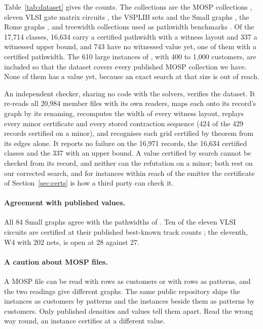 Table~\ref{tab:dataset} gives the counts. The collections are the MOSP
collections
\citep{SmithGent2005,FaggioliBentivoglio1998,ChuStuckey2009,CarvalhoSoma2015,Frinhani2018},
eleven VLSI gate matrix circuits \citep{OliveiraLorena2002}, the VSPLIB sets
\citep{Duarte2012} and the Small graphs \citep{MartiCamposPinana2008}, the Rome
graphs \citep{DiBattista1997}, and treewidth collections used as pathwidth
benchmarks \citep{TreewidthLIB,freetdi,PACE2016,PACE2017}. Of the 17,714
classes, 16,634 carry a certified pathwidth with a witness layout and 337 a witnessed upper bound, and 743 have no witnessed value yet, one of them with a certified pathwidth. The 610 large instances of \citet{Frinhani2018}, with
400 to 1,000 customers, are included so that the dataset covers every
published MOSP collection we have. None of them has a value yet, because an
exact search at that size is out of reach.

An independent checker, sharing no code with the solvers, verifies the
dataset. It re-reads all 20,984 member files with its own readers, maps each
onto its record's graph by its renaming, recomputes the width of every witness
layout, replays every minor certificate and every stored contraction sequence
(424 of the 429 records certified on a minor), and recognises each grid
certified by theorem from its edges alone. It reports no failure on the
16,971 records, the 16,634 certified classes and the 337 with an upper bound. A value certified by search cannot be checked from its record,
and neither can the refutation on a minor;
both rest on our corrected search, and for instances within reach of the emitter
the certificate of Section~\ref{sec:certs} is how a third party can check it.

\paragraph{Agreement with published values.} All 84 Small graphs agree with
the pathwidths of \citet[Tables~4--5]{Mallach2018}. Ten of the eleven VLSI
circuits are certified at their published best-known track counts
\citep[Table~I]{OliveiraLorena2002}; the eleventh, W4 with 202 nets, is open
at 28 against 27.

\paragraph{A caution about MOSP files.} A MOSP file can be read with rows as
customers or with rows as patterns, and the two readings give different
graphs. The same public repository ships the
\citet{CarvalhoSoma2015} instances as customers by patterns and the
\citet{ChuStuckey2009} instances beside them as patterns by customers. Only
published densities and values tell them apart. Read the wrong way round, an
instance certifies at a different value.
